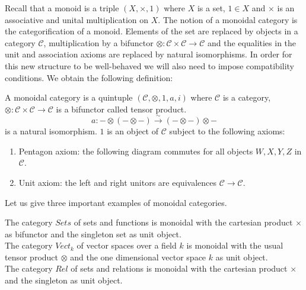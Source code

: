 \documentclass{article}
\newenvironment{definition}[1][Definition]{\begin{trivlist}
\item[\hskip \labelsep {\bfseries #1}]}{\end{trivlist}}
\newenvironment{example}[1][Example]{\begin{trivlist}
\item[\hskip \labelsep {\bfseries #1}]}{\end{trivlist}}
\begin{document}
Recall that a monoid is a triple $(X, \times, 1)$ where $X$ is a set, $1 \in X$ and $\times$ is an associative and unital multiplication on $X$. The notion of a monoidal category is the categorification of a monoid. Elements of the set are replaced by objects in a category $\mathcal{C}$, multiplication by a bifunctor $\otimes: \mathcal{C} \times \mathcal{C} \rightarrow \mathcal{C}$ and the equalities in the unit and association axioms are replaced by natural isomorphisms. In order for this new structure to be well-behaved we will also need to impose compatibility conditions.
We obtain the following definition:
\begin{definition}
A monoidal category is a quintuple $(\mathcal{C}, \otimes, 1, a, i)$ where $\mathcal{C}$ is a category, $\otimes: \mathcal{C} \times \mathcal{C} \rightarrow \mathcal{C}$ is a bifunctor called tensor product.
$$ a : -\otimes(- \otimes -) \xrightarrow{\sim} (-\otimes -) \otimes -$$ is a natural isomorphism. $1$ is an object of $\mathcal{C}$ subject to the following axioms:
\begin{enumerate}
    \item Pentagon axiom: the following diagram commutes for all objects $W,X,Y,Z$ in $\mathcal{C}$.
    \item Unit axiom: the left and right unitors are equivalences $\mathcal{C} \rightarrow \mathcal{C}$.
\end{enumerate}
\end{definition}
Let us give three important examples of monoidal categories.
\begin{example}
The category $Sets$ of sets and functions is monoidal with the cartesian product $\times$ as bifunctor and the singleton set as unit object.\\
The category $Vect_k$ of vector spaces over a field $k$ is monoidal with the usual tensor product $\otimes$ and the one dimensional vector space $k$ as unit object.\\
The category $Rel$ of sets and relations is monoidal with the cartesian product $\times$ and the singleton as unit object.
\end{example}
\end{document}
